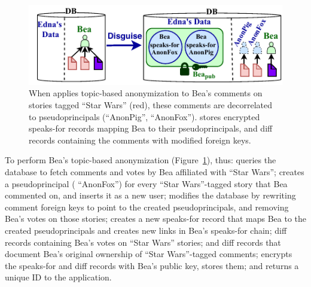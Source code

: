 \begin{figure}[t]
\centering
\includegraphics{figs/lobsters_catanon_visual}
\caption{When \sys applies topic-based anonymization to Bea's comments on
    stories tagged ``Star Wars'' (red), these comments are decorrelated to
    pseudoprincipals (``AnonPig'', ``AnonFox''). \sys stores encrypted
    speaks-for records mapping Bea to their
    pseudoprincipals, and diff records containing the comments with
    modified foreign keys.}
\label{f:lobsters_visual}
\end{figure}


%
To perform Bea's topic-based anonymization (Figure~\ref{f:lobsters_visual}),
\sys thus:
%
\one{} queries the database to fetch comments and votes by Bea
affiliated with ``Star Wars'';
%
\two{} creates a pseudoprincipal (\eg
``AnonFox'') for every ``Star Wars''-tagged story that Bea commented
on, and inserts it as a new user;
%
\three{} modifies the database by rewriting comment
foreign keys to point to the created pseudoprincipals, and
removing Bea's votes on those stories;
%
\four{} creates a new speaks-for record that maps Bea to the created
pseudoprincipals and creates new links in Bea's speaks-for chain; diff records containing Bea's votes on
``Star Wars'' stories; and diff records that document Bea's original
ownership of ``Star Wars''-tagged comments;
%
\five{} encrypts the speaks-for and diff records with Bea's public key, stores
them; and
%
\six{} returns a unique \xx ID to the application.

%
%
%

